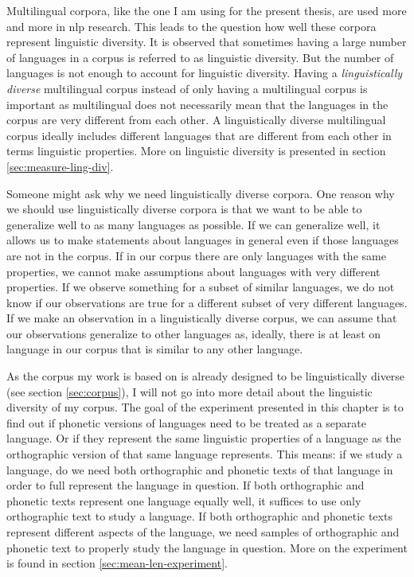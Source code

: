 
\label{chap:mwl}
Multilingual corpora, like the one I am using for the present thesis, are used more and more in \ac{nlp} research. This leads to the question how well these corpora represent linguistic diversity. It is observed that sometimes having a large number of languages in a corpus is referred to as linguistic diversity. But the number of languages is not enough to account for linguistic diversity. Having a \textit{linguistically diverse} multilingual corpus instead of only having a multilingual corpus is important as multilingual does not necessarily mean that the languages in the corpus are very different from each other. A linguistically diverse multilingual corpus ideally includes different languages that are different from each other in terms linguistic properties. More on linguistic diversity is presented in section \ref{sec:measure-ling-div}.

Someone might ask why we need linguistically diverse corpora. One reason why we should use linguistically diverse corpora is that we want to be able to generalize well to as many languages as possible. If we can generalize well, it allows us to make statements about languages in general even if those languages are not in the corpus. If in our corpus there are only languages with the same properties, we cannot make assumptions about languages with very different properties. If we observe something for a subset of similar languages, we do not know if our observations are true for a different subset of very different languages. If we make an observation in a linguistically diverse corpus, we can assume that our observations generalize to other languages as, ideally, there is at least on language in our corpus that is similar to any other language.

As the corpus my work is based on is already designed to be linguistically diverse (see section \ref{sec:corpus}), I will not go into more detail about the linguistic diversity of my corpus. The goal of the experiment presented in this chapter is to find out if phonetic versions of languages need to be treated as a separate language. Or if they represent the same linguistic properties of a language as the orthographic version of that same language represents. This means: if we study a language, do we need both orthographic and phonetic texts of that language in order to full represent the language in question. If both orthographic and phonetic texts represent one language equally well, it suffices to use only orthographic text to study a language. If both orthographic and phonetic texts represent different aspects of the language, we need samples of orthographic and phonetic text to properly study the language in question. More on the experiment is found in section \ref{sec:mean-len-experiment}.

